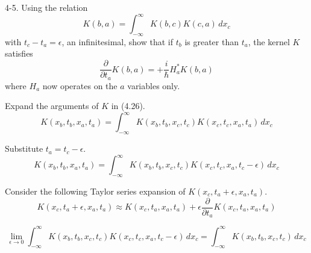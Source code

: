 \documentclass[12pt]{article}
\begin{document}
4-5.
Using the relation
\begin{equation*}
K(b,a)=\int_{-\infty}^\infty K(b,c)K(c,a)\,dx_c
\tag{4.26}
\end{equation*}
with $t_c-t_a=\epsilon$, an infinitesimal, show that if $t_b$ is greater than $t_a$,
the kernel $K$ satisfies
\begin{equation*}
\frac{\partial}{\partial t_a}K(b,a)=+\frac{i}{\hbar}H_a^*K(b,a)
\end{equation*}
where $H_a$ now operates on the $a$ variables only.

\bigskip
Expand the arguments of $K$ in (4.26).
\begin{equation*}
K(x_b,t_b,x_a,t_a)=\int_{-\infty}^\infty K(x_b,t_b,x_c,t_c)K(x_c,t_c,x_a,t_a)\,dx_c
\end{equation*}

Substitute $t_a=t_c-\epsilon$.
\begin{equation*}
K(x_b,t_b,x_a,t_a)=\int_{-\infty}^\infty K(x_b,t_b,x_c,t_c)K(x_c,t_c,x_a,t_c-\epsilon)\,dx_c
\end{equation*}

Consider the following Taylor series expansion of $K(x_c,t_a+\epsilon,x_a,t_a)$.
\begin{equation*}
K(x_c,t_a+\epsilon,x_a,t_a)\approx K(x_c,t_a,x_a,t_a)+\epsilon\frac{\partial}{\partial t_a}K(x_c,t_a,x_a,t_a)
\end{equation*}

\begin{equation*}
\lim_{\epsilon\rightarrow0}\int_{-\infty}^\infty K(x_b,t_b,x_c,t_c)K(x_c,t_c,x_a,t_c-\epsilon)\,dx_c
=\int_{-\infty}^\infty K(x_b,t_b,x_c,t_c)\,dx_c
\end{equation*}
\end{document}

